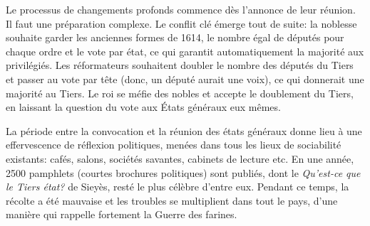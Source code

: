 \documentclass[
  french,
  letterpaper,
  DIV=11,
  numbers=noendperiod]{scrartcl}
\begin{document}
Le processus de changements profonds commence dès l'annonce de leur
réunion. Il faut une préparation complexe. Le conflit clé émerge tout de
suite: la noblesse souhaite garder les anciennes formes de 1614, le
nombre égal de députés pour chaque ordre et le vote par état, ce qui
garantit automatiquement la majorité aux privilégiés. Les réformateurs
souhaitent doubler le nombre des députés du Tiers et passer au vote par
tête (donc, un député aurait une voix), ce qui donnerait une majorité au
Tiers. Le roi se méfie des nobles et accepte le doublement du Tiers, en
laissant la question du vote aux États généraux eux mêmes.

La période entre la convocation et la réunion des états généraux donne
lieu à une effervescence de réflexion politiques, menées dans tous les
lieux de sociabilité existants: cafés, salons, sociétés savantes,
cabinets de lecture etc. En une année, 2500 pamphlets (courtes brochures
politiques) sont publiés, dont le \emph{Qu'est-ce que le Tiers état?} de
Sieyès, resté le plus célèbre d'entre eux. Pendant ce temps, la récolte
a été mauvaise et les troubles se multiplient dans tout le pays, d'une
manière qui rappelle fortement la Guerre des farines.
\end{document}
